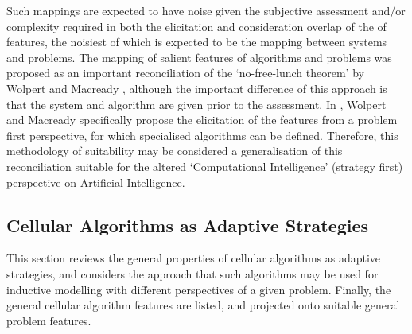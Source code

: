 Such mappings are expected to have noise given the subjective assessment and/or complexity required in both the elicitation and consideration overlap of the of features, the noisiest of which is expected to be the mapping between systems and problems. 
The mapping of salient features of algorithms and problems was proposed as an important reconciliation of the `no-free-lunch theorem' by Wolpert and Macready \cite{Wolpert1997}, although the important difference of this approach is that the system and algorithm are given prior to the assessment. In \cite{Wolpert1995}, Wolpert and Macready specifically propose the elicitation of the features from a problem first perspective, for which specialised algorithms can be defined. Therefore, this methodology of suitability may be considered a generalisation of this reconciliation suitable for the altered `Computational Intelligence' (strategy first) perspective on Artificial Intelligence.

%
%
\subsection{Cellular Algorithms as Adaptive Strategies}
This section reviews the general properties of cellular algorithms as adaptive strategies, and considers the approach that such algorithms may be used for inductive modelling with different perspectives of a given problem. Finally, the general cellular algorithm features are listed, and projected onto suitable general problem features.

%
%
